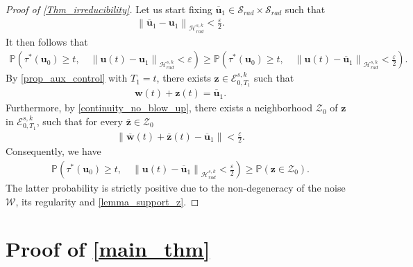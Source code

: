 \documentclass[12pt,reqno]{amsart}
\theoremstyle{plain}
\theoremstyle{remark}
\theoremstyle{plain}
\theoremstyle{definition}
\numberwithin{equation}{section}
\numberwithin{equation}{section}
\newcommand{\norm}[1]{\left\|#1\right\|}
\newcommand{\HH}{\mathcal{H}}
\newcommand{\eps}{\varepsilon}
\begin{document}
	\begin{proof}[Proof of \autoref{Thm_irreducibility}]
		Let us start fixing  $\mathbf{\overline{u}}_1\in \mathscr{S}_{rad}\times \mathscr{S}_{rad} $ such that \begin{align*}
			\norm{\mathbf{\overline{u}}_1-\mathbf{u}_1}_{\HH_{rad}^{s,k}}<\frac{\eps}{2}.
		\end{align*}
		It then follows that
		\begin{align*}
			\mathbb{P}\left(\tau^*(\mathbf{u}_0)\geq t,\quad \norm{\mathbf{u}(t)-\mathbf{u}_1}_{\HH_{rad}^{s,k}}<\eps\right)\geq \mathbb{P}\left(\tau^*(\mathbf{u}_0)\geq t,\quad \norm{\mathbf{u}(t)-\mathbf{\overline{u}}_1}_{\HH_{rad}^{s,k}}<\frac{\eps}{2}\right).
		\end{align*}
		By \autoref{prop_aux_control} with $T_1=t$, there exists $\mathbf{z}\in \mathcal{E}^{s,k}_{0,T_1}$ such that \begin{align*}
		    \mathbf{w}(t)+\mathbf{z}(t)=\mathbf{\overline{u}}_1.
		\end{align*} Furthermore, by \autoref{continuity_no_blow_up}, there exists a neighborhood $\mathcal{Z}_0$ of $\mathbf{z}$ in $\mathcal{E}^{s,k}_{0,T_1}$,  such that for every $\mathbf{\overline{z}}\in \mathcal{Z}_0 $
        \begin{align*}
        \norm{\mathbf{\overline{w}}(t)+\mathbf{\overline{z}}(t)-\mathbf{\overline{u}}_1}<\frac{\eps}{2}.
        \end{align*}
        Consequently, we have
		\begin{align*}
			\mathbb{P}\left(\tau^*(\mathbf{u}_0)\geq t,\quad\norm{\mathbf{u}(t)-\mathbf{\overline{u}}_1}_{\HH_{rad}^{s,k}}<\frac{\eps}{2}\right)\geq \mathbb{P}(\mathbf{z}\in \mathcal{Z}_0).    
		\end{align*}
		The latter probability is strictly positive due to the non-degeneracy of the noise $\mathcal{W}$, its regularity and \autoref{lemma_support_z}.
	\end{proof}
	\section{Proof of \autoref{main_thm}}
    
\end{document}
